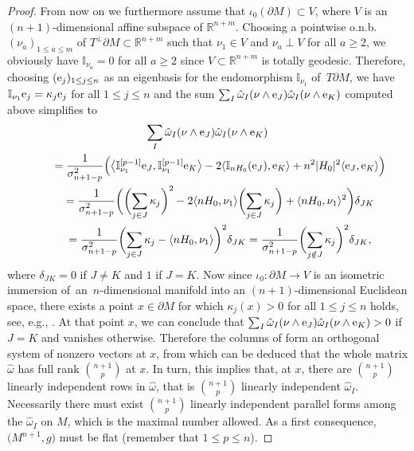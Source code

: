 \documentclass[pdftex]{sigma}
\numberwithin{equation}{section}
\begin{document}
\begin{proof}
From now on we furthermore assume that $\iota_0(\partial M)\subset V$, where $V$ is an $(n+1)$-dimensional affine subspace of $\mathbb{R}^{n+m}$.
Choosing a pointwise o.n.b.\ $(\nu_a)_{1\leq a\leq m}$ of $T^\perp\partial M\subset\mathbb{R}^{n+m}$ such that $\nu_1\in V$ and $\nu_a\perp V$ for all $a\geq2$, we obviously have $\mathbb{I}_{\nu_a}=0$ for all $a\geq2$ since $V\subset\mathbb{R}^{n+m}$ is totally geodesic. Therefore, choosing $({\rm e}_j)_{1\leq j\leq n}$ as an eigenbasis for the endomorphism $\mathbb{I}_{\nu_1}$ of~$T\partial M$, we have $\mathbb{I}_{\nu_1}{\rm e}_j=\kappa_j {\rm e}_j$ for all $1\leq j\leq n$ and the sum $\sum_I\hat{\omega}_I(\nu\wedge {\rm e}_J)\hat{\omega}_I(\nu\wedge {\rm e}_K)$ computed above simplifies to
\begin{gather*}
\sum_I\hat{\omega}_I(\nu\wedge {\rm e}_J)\hat{\omega}_I(\nu\wedge {\rm e}_K)\\
\qquad{}=\frac{1}{\sigma_{n+1-p}^2}\Big(\bigl\langle \mathbb{I}_{\nu_1}^{[p-1]}{\rm e}_J,\mathbb{I}_{\nu_1}^{[p-1]}{\rm e}_K\bigr\rangle
-2\langle\mathbb{I}_{nH_0}({\rm e}_J),{\rm e}_K\rangle+n^2|H_0|^2\langle {\rm e}_J,{\rm e}_K\rangle\Big)\\
\qquad{}=\frac{1}{\sigma_{n+1-p}^2}\biggl(\biggl(\sum_{j\in J}\kappa_j\biggr)^2-2\langle nH_0,\nu_1\rangle\biggl(\sum_{j\in J}\kappa_j\biggr)+\langle nH_0,\nu_1\rangle^2\biggr)\delta_{JK}\\
\qquad{}=\frac{1}{\sigma_{n+1-p}^2}\biggl(\sum_{j\in J}\kappa_j-\langle nH_0,\nu_1\rangle\biggr)^2\delta_{JK}
=\frac{1}{\sigma_{n+1-p}^2}\biggl(\sum_{j\notin J}\kappa_j\biggr)^2\delta_{JK},
\end{gather*}
where $\delta_{JK}=0$ if $J\neq K$ and $1$ if $J=K$. Now since $\iota_0\colon \partial M\to V$ is an isometric immersion of~an~$n$-dimensional manifold into an $(n+1)$-dimensional Euclidean space, there exists a point $x\in\partial M$ for which $\kappa_j(x)>0$ for all $1\leq j\leq n$ holds, see, e.g., \cite[p.~255]{GallotHulinLafontaine04}. At that point $x$, we can conclude that $\sum_I\hat{\omega}_I(\nu\wedge {\rm e}_J)\hat{\omega}_I(\nu\wedge {\rm e}_K)>0$ if $J=K$ and vanishes otherwise.
Therefore the columns of  form an orthogonal system of nonzero vectors at $x$, from which can be deduced that the whole matrix $\hat{\omega}$ has full rank $\binom{n+1}{p}$ at $x$. In turn, this implies that, at $x$, there are $\binom{n+1}{p}$ linearly independent rows in $\hat{\omega}$, that is $\binom{n+1}{p}$ linearly independent $\hat{\omega}_I$. Necessarily there must exist $\binom{n+1}{p}$ linearly independent parallel forms among the $\hat{\omega}_I$ on $M$, which is the maximal number allowed. As a first consequence, $\bigl(M^{n+1},g\bigr)$ must be flat (remember that $1\leq p\leq n$).

\end{proof}
\end{document}
